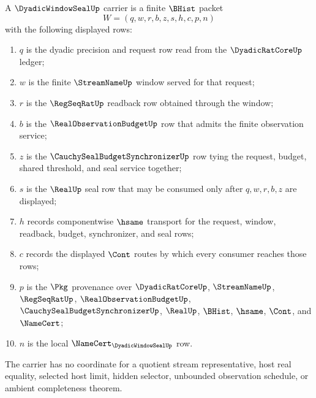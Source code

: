 \begin{definition}
\label{def:dyadic-window-seal-carrier}
A $\DyadicWindowSealUp$ carrier is a finite $\BHist$ packet
$$
W=(q,w,r,b,z,s,h,c,p,n)
$$
with the following displayed rows:
\begin{enumerate}
\item $q$ is the dyadic precision and request row read from the $\DyadicRatCoreUp$ ledger;
\item $w$ is the finite $\StreamNameUp$ window served for that request;
\item $r$ is the $\RegSeqRatUp$ readback row obtained through the window;
\item $b$ is the $\RealObservationBudgetUp$ row that admits the finite observation service;
\item $z$ is the $\CauchySealBudgetSynchronizerUp$ row tying the request, budget, shared threshold, and seal service together;
\item $s$ is the $\RealUp$ seal row that may be consumed only after $q,w,r,b,z$ are displayed;
\item $h$ records componentwise $\hsame$ transport for the request, window, readback, budget, synchronizer, and seal rows;
\item $c$ records the displayed $\Cont$ routes by which every consumer reaches those rows;
\item $p$ is the $\Pkg$ provenance over $\DyadicRatCoreUp$, $\StreamNameUp$, $\RegSeqRatUp$, $\RealObservationBudgetUp$, $\CauchySealBudgetSynchronizerUp$, $\RealUp$, $\BHist$, $\hsame$, $\Cont$, and $\NameCert$;
\item $n$ is the local $\NameCert_{\DyadicWindowSealUp}$ row.
\end{enumerate}
The carrier has no coordinate for a quotient stream representative, host real equality, selected host limit, hidden selector, unbounded observation schedule, or ambient completeness theorem.
\end{definition}

